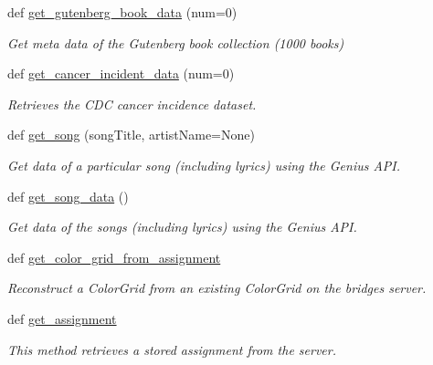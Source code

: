 \begin{DoxyCompactItemize}
def \hyperlink{namespacebridges_1_1data__src__dependent_1_1data__source_af377da50c8f4e488b832978908274089}{get\+\_\+gutenberg\+\_\+book\+\_\+data} (num=0)
\begin{DoxyCompactList}\small\item\em Get meta data of the Gutenberg book collection (1000 books) \end{DoxyCompactList}\item 
def \hyperlink{namespacebridges_1_1data__src__dependent_1_1data__source_ac711dee7446daedd503ce0f091a5f85e}{get\+\_\+cancer\+\_\+incident\+\_\+data} (num=0)
\begin{DoxyCompactList}\small\item\em Retrieves the C\+DC cancer incidence dataset. \end{DoxyCompactList}\item 
def \hyperlink{namespacebridges_1_1data__src__dependent_1_1data__source_a060ab8ec1777a5458a37d5e01e594e82}{get\+\_\+song} (song\+Title, artist\+Name=None)
\begin{DoxyCompactList}\small\item\em Get data of a particular song (including lyrics) using the Genius A\+PI. \end{DoxyCompactList}\item 
def \hyperlink{namespacebridges_1_1data__src__dependent_1_1data__source_abf7f1f53dc13383fa296cb597e4a7ee0}{get\+\_\+song\+\_\+data} ()
\begin{DoxyCompactList}\small\item\em Get data of the songs (including lyrics) using the Genius A\+PI. \end{DoxyCompactList}\item 
def \hyperlink{namespacebridges_1_1data__src__dependent_1_1data__source_a87295c22accd698a4573e9f4287c4096}{get\+\_\+color\+\_\+grid\+\_\+from\+\_\+assignment}
\begin{DoxyCompactList}\small\item\em Reconstruct a Color\+Grid from an existing Color\+Grid on the bridges server. \end{DoxyCompactList}\item 
def \hyperlink{namespacebridges_1_1data__src__dependent_1_1data__source_add1ea37030fe616297d99cfdf4ae890d}{get\+\_\+assignment}
\begin{DoxyCompactList}\small\item\em This method retrieves a stored assignment from the server. \end{DoxyCompactList}\item 

\end{DoxyCompactItemize}

